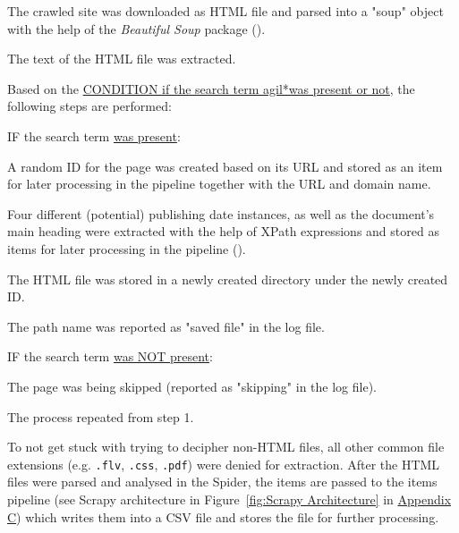 \begin{compactenum}
    \setlength
    \itemsep{0em}
        \item The crawled site was downloaded as HTML file and parsed into a "soup" object with the help of the \textit{Beautiful Soup} package (\cite{Richardson2007}).
        \item The text of the HTML file was extracted.
        \item Based on the \underline{CONDITION if the search term agil*\footnotemark  was present or not}, the following steps are performed: 
        \begin{compactenum}
            \item IF the search term \underline{was present}:
            \begin{compactenum}
                \item A random ID for the page was created  based on its URL and stored as an item for later processing in the pipeline together with the URL and domain name.
                \item Four different (potential) publishing date instances, as well as the document's main heading were extracted with the help of XPath expressions and stored as items for later processing in the pipeline (\cite{W3schools.com2020}).
                \item The HTML file was stored in a newly created directory under the newly created ID.
                \item The path name was reported as "saved file" in the log file. 
            \end{compactenum}
            \item IF the search term \underline{was NOT present}:
            \begin{compactenum}
                \item The page was being skipped (reported as "skipping" in the log file).
            \end{compactenum}
        \end{compactenum}
        \item The process repeated from step 1. 
\end{compactenum}
To not get stuck with trying to decipher non-HTML files, all other common file extensions (e.g. \texttt{.flv}, \texttt{.css}, \texttt{.pdf}) were denied for extraction. After the HTML files were parsed and analysed in the Spider, the items are passed to the items pipeline (see Scrapy architecture in Figure~\ref{fig:Scrapy Architecture} in \hyperref[Appendix C]{Appendix C}) which writes them into a CSV file and stores the file for further processing.

